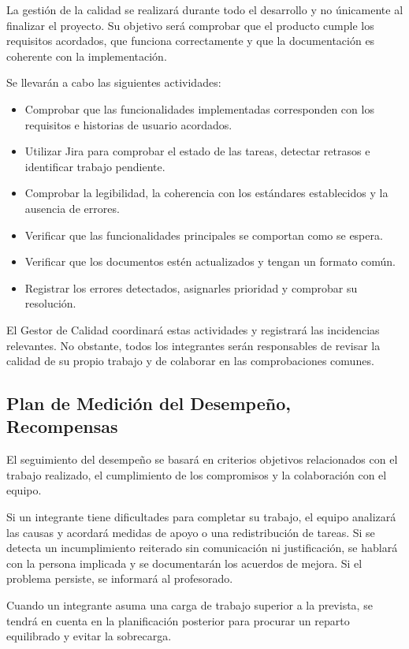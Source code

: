 La gestión de la calidad se realizará durante todo el desarrollo y no únicamente al finalizar el proyecto. Su objetivo será comprobar que el producto cumple los requisitos acordados, que funciona correctamente y que la documentación es coherente con la implementación.

Se llevarán a cabo las siguientes actividades:

\begin{itemize}
    \item Comprobar que las funcionalidades implementadas corresponden con los requisitos e historias de usuario acordados.
    \item Utilizar Jira para comprobar el estado de las tareas, detectar retrasos e identificar trabajo pendiente.
    \item Comprobar la legibilidad, la coherencia con los estándares establecidos y la ausencia de errores.
    \item Verificar que las funcionalidades principales se comportan como se espera.
    \item Verificar que los documentos estén actualizados y tengan un formato común.
    \item Registrar los errores detectados, asignarles prioridad y comprobar su resolución.
\end{itemize}

El Gestor de Calidad coordinará estas actividades y registrará las incidencias relevantes. No obstante, todos los integrantes serán responsables de revisar la calidad de su propio trabajo y de colaborar en las comprobaciones comunes.

\subsection{Plan de Medición del Desempeño, Recompensas}

El seguimiento del desempeño se basará en criterios objetivos relacionados con el trabajo realizado, el cumplimiento de los compromisos y la colaboración con el equipo.

Si un integrante tiene dificultades para completar su trabajo, el equipo analizará las causas y acordará medidas de apoyo o una redistribución de tareas. Si se detecta un incumplimiento reiterado sin comunicación ni justificación, se hablará con la persona implicada y se documentarán los acuerdos de mejora. Si el problema persiste, se informará al profesorado.

Cuando un integrante asuma una carga de trabajo superior a la prevista, se tendrá en cuenta en la planificación posterior para procurar un reparto equilibrado y evitar la sobrecarga.

